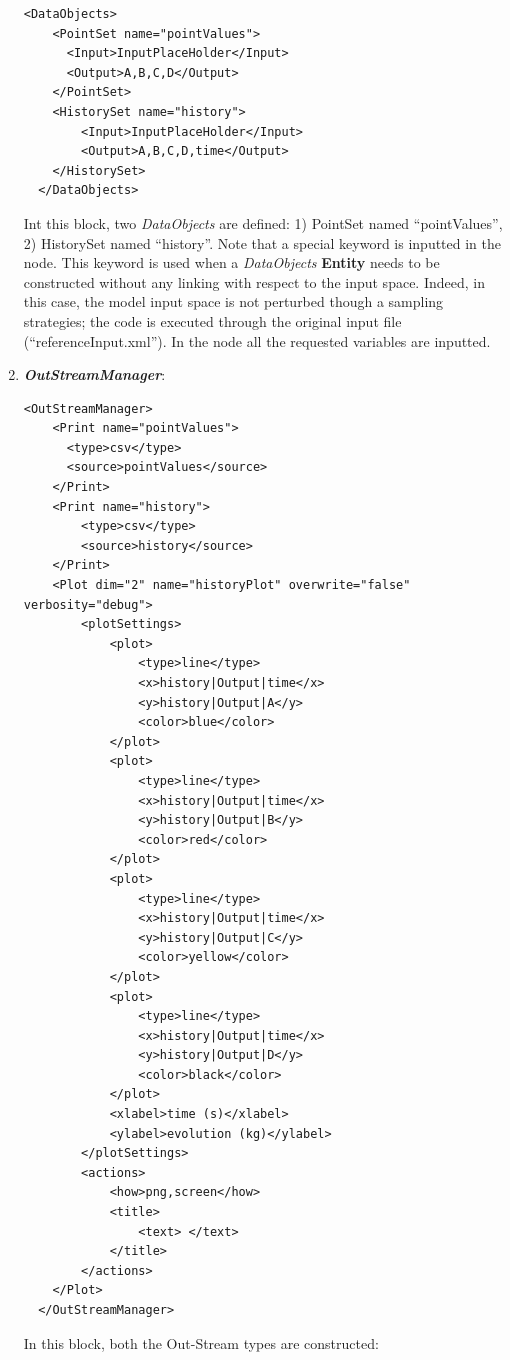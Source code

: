 \begin{enumerate}
\begin{lstlisting}[style=XML,morekeywords={arg,extension,pauseAtEnd,overwrite}]
  <DataObjects>
    <PointSet name="pointValues">
      <Input>InputPlaceHolder</Input>
      <Output>A,B,C,D</Output>
    </PointSet>
    <HistorySet name="history">
        <Input>InputPlaceHolder</Input>
        <Output>A,B,C,D,time</Output>
    </HistorySet>
  </DataObjects>
\end{lstlisting}
  Int this block, two \textit{DataObjects} are defined: 1) PointSet named ``pointValues'', 2) HistorySet named ``history''.
  Note that a special keyword is inputted in the  node. This keyword is used when a \textit{DataObjects}  \textbf{Entity} needs to be constructed without any linking with respect to the input space. Indeed, in 
  this case, the model input space is not perturbed though a sampling strategies; the code is executed through the original
   input file   (``referenceInput.xml''). In the  node all the requested variables are inputted.
   \item \textbf{\textit{OutStreamManager}}:   
\begin{lstlisting}[style=XML,morekeywords={arg,extension,pauseAtEnd,overwrite}]
  <OutStreamManager>
    <Print name="pointValues">
      <type>csv</type>
      <source>pointValues</source>
    </Print>
    <Print name="history">
        <type>csv</type>
        <source>history</source>
    </Print>
    <Plot dim="2" name="historyPlot" overwrite="false" verbosity="debug">
        <plotSettings>
            <plot>
                <type>line</type>
                <x>history|Output|time</x>
                <y>history|Output|A</y>
                <color>blue</color>
            </plot>
            <plot>
                <type>line</type>
                <x>history|Output|time</x>
                <y>history|Output|B</y>
                <color>red</color>
            </plot>
            <plot>
                <type>line</type>
                <x>history|Output|time</x>
                <y>history|Output|C</y>
                <color>yellow</color>
            </plot>
            <plot>
                <type>line</type>
                <x>history|Output|time</x>
                <y>history|Output|D</y>
                <color>black</color>
            </plot>
            <xlabel>time (s)</xlabel>
            <ylabel>evolution (kg)</ylabel>
        </plotSettings>
        <actions>
            <how>png,screen</how>
            <title>
                <text> </text>
            </title>
        </actions>
    </Plot>
  </OutStreamManager>
\end{lstlisting}
  In this block, both the Out-Stream types are constructed: 

\end{enumerate}
